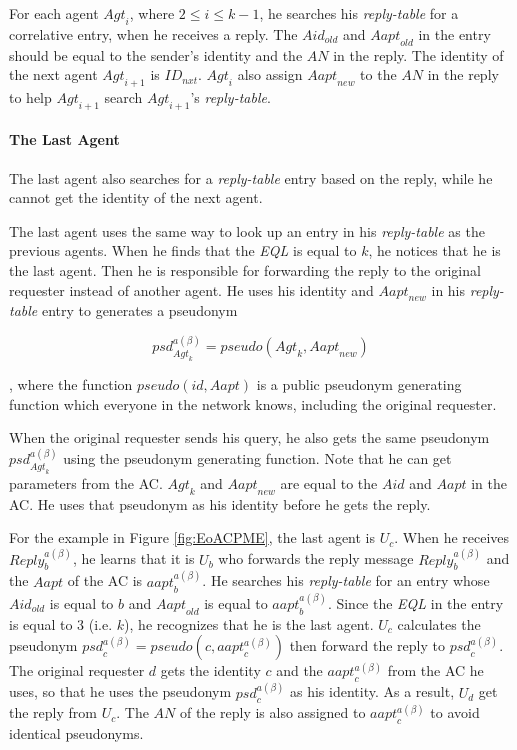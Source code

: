 \documentclass[conference]{IEEEtran}
\begin{document}
For each agent ${Agt}_i$, where $2\le i\le k-1$, he searches his \textit{reply-table} for a correlative entry, when he receives a reply. The ${Aid}_{old}$ and ${Aapt}_{old}$ in the entry should be equal to the sender's identity and the $AN$ in the reply. The identity of the next agent ${Agt}_{i+1}$ is ${ID}_{nxt}$. ${Agt}_i$ also assign ${Aapt}_{new}$ to the $AN$ in the reply to help ${Agt}_{i+1}$ search ${Agt}_{i+1}$'s \textit{reply-table}.

\paragraph{ The Last Agent} \label{paraLastAgent}

The last agent also searches for a \textit{reply-table} entry based on the reply, while he cannot get the identity of the next agent.

The last agent uses the same way to look up an entry in his \textit{reply-table} as the previous agents. When he finds that the \textit{EQL} is equal to $k$, he notices that he is the last agent. Then he is responsible for forwarding the reply to the original requester instead of another agent. He uses his identity and ${Aapt}_{new}$ in his \textit{reply-table} entry to generates a pseudonym

\begin{equation} \label{GrindEQ__ACPPsd} 
{psd}_{{Agt}_k}^{a\left( \beta \right)}=pseudo\left({Agt}_k,{Aapt}_{new}\right)
\end{equation}

, where the function $pseudo\left(id,Aapt\right)$ is a public pseudonym generating function which everyone in the network knows, including the original requester.

When the original requester sends his query, he also gets the same pseudonym ${psd}_{{Agt}_k}^{a\left( \beta \right)}$ using the pseudonym generating function. Note that he can get parameters from the AC. ${Agt}_k$ and ${Aapt}_{new}$ are equal to the $Aid$ and $Aapt$ in the AC. He uses that pseudonym as his identity before he gets the reply.

For the example in Figure \ref{fig:EoACPME}, the last agent is $U_c$. When he receives ${Reply}^{a\left(\beta\right)}_b$, he learns that it is $U_b$ who forwards the reply message ${Reply}^{a\left(\beta\right)}_b$ and the $Aapt$ of the AC is ${aapt}^{a\left(\beta\right)}_b$. He searches his \textit{reply-table} for an entry whose ${Aid}_{old}$ is equal to $b$ and ${Aapt}_{old}$ is equal to ${aapt}^{a\left(\beta\right)}_b$. Since the \textit{EQL} in the entry is equal to 3 (i.e. $k$), he recognizes that he is the last agent. $U_c$ calculates the pseudonym ${psd}^{a\left(\beta \right)}_c=pseudo\left(c,{aapt}^{a\left(\beta\right)}_c\right)$ then forward the reply to ${psd}^{a\left(\beta\right)}_c$. The original requester $d$ gets the identity $c$ and the ${aapt}^{a\left(\beta \right)}_c$ from the AC he uses, so that he uses the pseudonym ${psd}^{a\left(\beta \right)}_c$ as his identity. As a result, $U_d$ get the reply from $U_c$. The $AN$ of the reply is also assigned to ${aapt}^{a\left(\beta\right)}_c$ to avoid identical pseudonyms.
\end{document}
